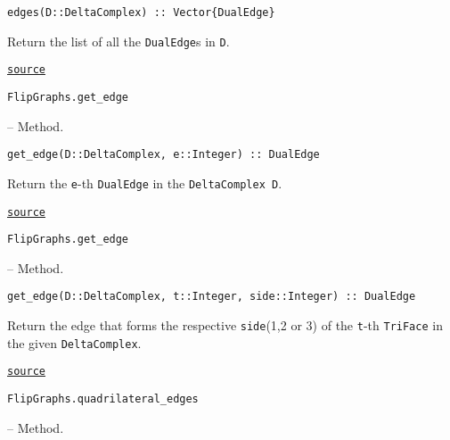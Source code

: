 \begin{adjustwidth}{2em}{0pt}


\begin{verbatim}
edges(D::DeltaComplex) :: Vector{DualEdge}
\end{verbatim}

Return the list of all the \texttt{DualEdge}s in \texttt{D}.



\href{https://github.com/schto223/FlipGraphs.jl/blob/e35d43698a06b86273148826b79d585ba04fcd26/src/deltaComplex.jl#L324-L328}{\texttt{source}}


\end{adjustwidth}
\hypertarget{3085851381282903585}{\texttt{FlipGraphs.get\_edge}}  -- {Method.}

\begin{adjustwidth}{2em}{0pt}


\begin{verbatim}
get_edge(D::DeltaComplex, e::Integer) :: DualEdge
\end{verbatim}

Return the \texttt{e}-th \texttt{DualEdge} in the \texttt{DeltaComplex D}.



\href{https://github.com/schto223/FlipGraphs.jl/blob/e35d43698a06b86273148826b79d585ba04fcd26/src/deltaComplex.jl#L310-L314}{\texttt{source}}


\end{adjustwidth}
\hypertarget{14400153517699669145}{\texttt{FlipGraphs.get\_edge}}  -- {Method.}

\begin{adjustwidth}{2em}{0pt}


\begin{verbatim}
get_edge(D::DeltaComplex, t::Integer, side::Integer) :: DualEdge
\end{verbatim}

Return the edge that forms the respective \texttt{side}(1,2 or 3) of the \texttt{t}-th \texttt{TriFace} in the given \texttt{DeltaComplex}.



\href{https://github.com/schto223/FlipGraphs.jl/blob/e35d43698a06b86273148826b79d585ba04fcd26/src/deltaComplex.jl#L317-L321}{\texttt{source}}


\end{adjustwidth}
\hypertarget{17895896900520043067}{\texttt{FlipGraphs.quadrilateral\_edges}}  -- {Method.}

